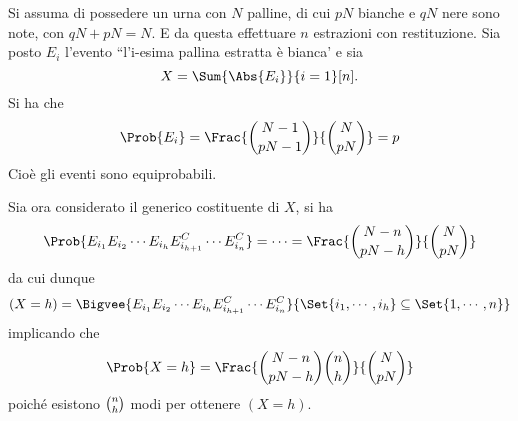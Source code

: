 \documentclass{subfiles}
\begin{document}
Si assuma di possedere un urna con $N$ palline, di cui $pN$ bianche e $qN$ nere sono note, con $qN + pN = N$.
E da questa effettuare $n$ estrazioni con restituzione.
Sia posto $E_{i}$ l'evento ``l'i-esima pallina estratta è bianca' e sia
$$
    X = \Sum{\Abs{E_{i}}}{i = 1}[n].
$$
Si ha che
$$
    \Prob{E_i} = \Frac{\binom{N - 1}{pN - 1}}{\binom{N}{pN}} = p
$$
Cioè gli eventi sono equiprobabili.

Sia ora considerato il generico costituente di $X$, si ha
$$
    \Prob{E_{i_{1}}E_{i_{2}} \cdots E_{i_{h}}E^{C}_{i_{h + 1}} \cdots E^{C}_{i_{n}}} = \cdots = \Frac{\binom{N - n}{pN - h}}{\binom{N}{pN}}
$$
da cui dunque
$$
    (X = h) = \Bigvee{E_{i_{1}}E_{i_{2}} \cdots E_{i_{h}}E^{C}_{i_{h + 1}} \cdots E^{C}_{i_{n}}}{\Set{i_{1}, \cdots, i_{h}} \subseteq \Set{1, \cdots, n}}
$$
implicando che
$$
    \Prob{X = h} = \Frac{\binom{N - n}{pN - h} \binom{n}{h}}{\binom{N}{pN}}
$$
poiché esistono $\tbinom{n}{h}$ modi per ottenere $(X = h)$.
\end{document}
